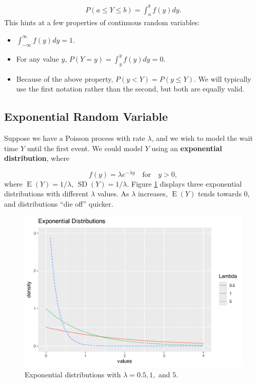 \documentclass[
]{krantz}
\providecommand{\tightlist}{%
  \setlength{\itemsep}{0pt}\setlength{\parskip}{0pt}}
\newcommand{\E}{\operatorname{E}}
\newcommand{\SD}{\operatorname{SD}}
\begin{document}
\begin{align*}
P(a \le Y \le b) = \int_a^b f(y)dy.
\end{align*}
This hints at a few properties of continuous random variables:

\begin{itemize}
\tightlist
\item
  \(\int_{-\infty}^{\infty} f(y)dy = 1\).\\
\item
  For any value \(y\), \(P(Y = y) = \int_y^y f(y)dy = 0\).\\
\item
  Because of the above property, \(P(y < Y) = P(y \le Y)\). We will typically use the first notation rather than the second, but both are equally valid.
\end{itemize}

\hypertarget{exponential-random-variable}{%
\subsection{Exponential Random Variable}\label{exponential-random-variable}}

Suppose we have a Poisson process with rate \(\lambda\), and we wish to model the wait time \(Y\) until the first event. We could model \(Y\) using an \textbf{exponential distribution},  where

\begin{equation}
f(y) = \lambda e^{-\lambda y} \quad \textrm{for} \quad y > 0,
\label{eq:expRV}
\end{equation}
where \(\E(Y) = 1/\lambda\), \(\SD(Y) = 1/\lambda\). Figure \ref{fig:multExp} displays three exponential distributions with different \(\lambda\) values. As \(\lambda\) increases, \(\E(Y)\) tends towards 0, and distributions ``die off'' quicker.



\begin{figure}

{\centering \includegraphics[width=0.6\linewidth]{bookdown-BeyondMLR_files/figure-latex/multExp-1} 

}

\caption{Exponential distributions with \(\lambda = 0.5, 1,\) and \(5\).}\label{fig:multExp}
\end{figure}
\end{document}
